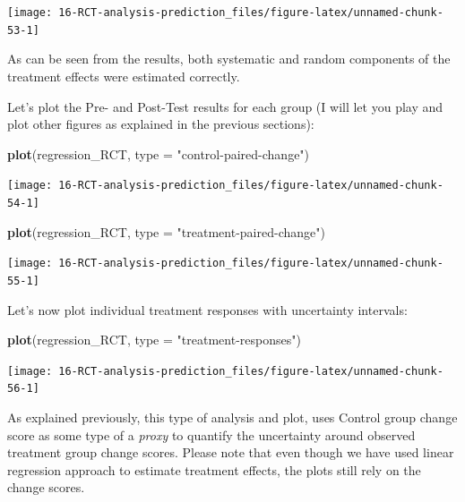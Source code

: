 \documentclass[
]{book}
\newenvironment{Shaded}{\begin{snugshade}}{\end{snugshade}}
\newcommand{\DataTypeTok}[1]{\textcolor[rgb]{0.13,0.29,0.53}{#1}}
\newcommand{\KeywordTok}[1]{\textcolor[rgb]{0.13,0.29,0.53}{\textbf{#1}}}
\newcommand{\NormalTok}[1]{#1}
\newcommand{\StringTok}[1]{\textcolor[rgb]{0.31,0.60,0.02}{#1}}
\begin{document}
\begin{center}\texttt{[image: 16-RCT-analysis-prediction\_files/figure-latex/unnamed-chunk-53-1]} \end{center}

As can be seen from the results, both systematic and random components of the treatment effects were estimated correctly.

Let's plot the Pre- and Post-Test results for each group (I will let you play and plot other figures as explained in the previous sections):

\begin{Shaded}
\begin{Highlighting}[]
\KeywordTok{plot}\NormalTok{(regression\_RCT, }\DataTypeTok{type =} \StringTok{"control{-}paired{-}change"}\NormalTok{)}
\end{Highlighting}
\end{Shaded}

\begin{center}\texttt{[image: 16-RCT-analysis-prediction\_files/figure-latex/unnamed-chunk-54-1]} \end{center}

\begin{Shaded}
\begin{Highlighting}[]
\KeywordTok{plot}\NormalTok{(regression\_RCT, }\DataTypeTok{type =} \StringTok{"treatment{-}paired{-}change"}\NormalTok{)}
\end{Highlighting}
\end{Shaded}

\begin{center}\texttt{[image: 16-RCT-analysis-prediction\_files/figure-latex/unnamed-chunk-55-1]} \end{center}

Let's now plot individual treatment responses with uncertainty intervals:

\begin{Shaded}
\begin{Highlighting}[]
\KeywordTok{plot}\NormalTok{(regression\_RCT, }\DataTypeTok{type =} \StringTok{"treatment{-}responses"}\NormalTok{)}
\end{Highlighting}
\end{Shaded}

\begin{center}\texttt{[image: 16-RCT-analysis-prediction\_files/figure-latex/unnamed-chunk-56-1]} \end{center}

As explained previously, this type of analysis and plot, uses Control group change score as some type of a \emph{proxy} to quantify the uncertainty around observed treatment group change scores. Please note that even though we have used linear regression approach to estimate treatment effects, the plots still rely on the change scores.
\end{document}
